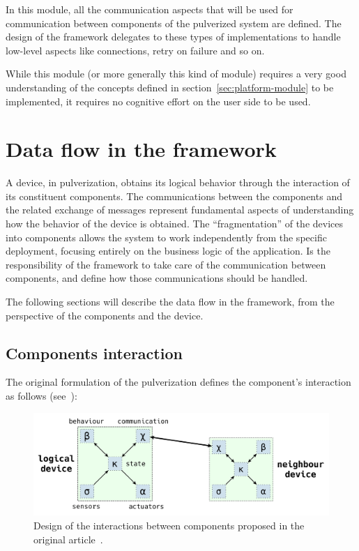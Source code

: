 In this module, all the communication aspects that will be used for communication between components of the pulverized system are defined.
The design of the framework delegates to these types of implementations to handle low-level aspects like connections, retry on failure and so on.

While this module (or more generally this kind of module) requires a very good understanding of the concepts defined in
section~\ref{sec:platform-module} to be implemented, it requires no cognitive effort on the user side to be used.


\section{Data flow in the framework}
\label{sec:framework-data-flow}

A device, in pulverization, obtains its logical behavior through the interaction of its constituent components. The communications between the
components and the related exchange of messages represent fundamental aspects of understanding how the behavior of the device is obtained.
The ``fragmentation'' of the devices into components allows the system to work independently from the specific deployment, focusing entirely on
the business logic of the application.
Is the responsibility of the framework to take care of the communication between components, and define how those communications should be handled.

The following sections will describe the data flow in the framework, from the perspective of the components and the device.

\subsection{Components interaction}
\label{sec:framework-components-interaction}

The original formulation of the pulverization defines the component's interaction as follows (see~):

\begin{figure}[ht]
	\centering
	\includegraphics[width=\textwidth]{figures/original-components-interactions.pdf}
	\caption{Design of the interactions between components proposed in the original article~\cite{fi12110203}.}
	\label{fig:framework-components-interaction}
\end{figure}

